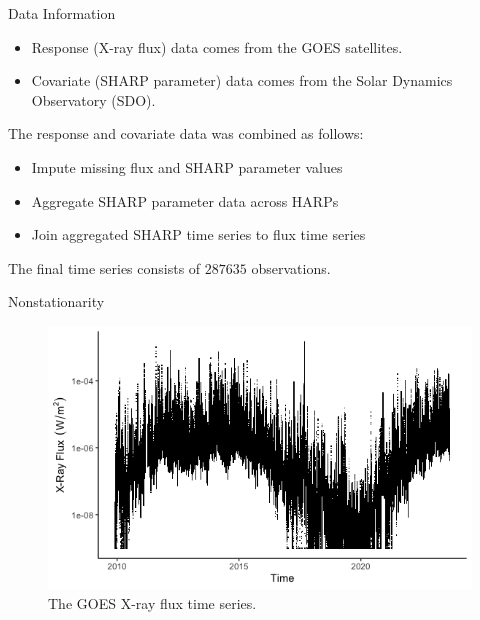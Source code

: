\documentclass{beamer}
\begin{document}
\begin{frame}{Data Information}
    \begin{itemize}
        \item Response (X-ray flux) data comes from the GOES satellites.
        \item Covariate (SHARP parameter) data comes from the Solar Dynamics Observatory (SDO).
    \end{itemize}

    The response and covariate data was combined as follows:
    \begin{itemize}
        \item Impute missing flux and SHARP parameter values
        \item Aggregate SHARP parameter data across HARPs 
        \item Join aggregated SHARP time series to flux time series
    \end{itemize}
    The final time series consists of $\num[group-separator={,}]{287635}$ observations.
\end{frame}

\begin{frame}{Nonstationarity}
    \begin{figure}
        \centering
        \includegraphics[scale=0.5]{flux_plot.png}
        \caption{The GOES X-ray flux time series.}
        \label{fig:flux_plot}
    \end{figure}
\end{frame}
\end{document}
